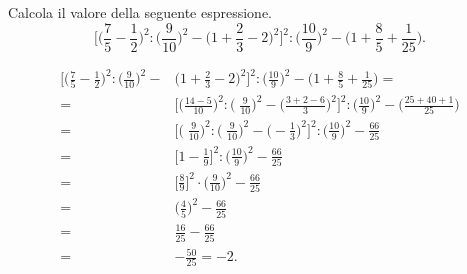 \begin{esempio}
   Calcola il valore della seguente espressione.
\[\bigg[\bigg(\frac{7}{5}-\frac{1}{2}\bigg)^{2}:\bigg(\frac{9}{10}\bigg)^{2}-\bigg(1+\frac{2}{3}-2\bigg)^{2}\bigg]^{2}:\bigg(\frac{10}{9}\bigg)^{2}-\bigg(1+\frac{8}{5}+\frac{1}{25}\bigg).\]

 \begin{align*}
\bigg[\bigg(\frac{7}{5}-\frac{1}{2}\bigg)^{2}:\bigg(\frac{9}{10}\bigg)^{2}-&\bigg(1+\frac{2}{3}-2\bigg)^{2}\bigg]^{2}:%
\bigg(\frac{10}{9}\bigg)^{2}-\bigg(1+\frac{8}{5}+\frac{1}{25}\bigg)=\\
=&\bigg[\bigg(\frac{14-5}{10}\bigg)^{2}:\bigg(\;\frac{9}{10}\bigg)^{2}-\bigg(\frac{3+2-6}{3}\bigg)^{2}\bigg]^{2}:%
\bigg(\frac{10}{9}\bigg)^{2}-\bigg(\frac{25+40+1}{25}\bigg)\\
=&\bigg[\bigg(\;\frac{9}{10}\bigg)^{2}:\bigg(\;\frac{9}{10}\bigg)^{2}-\bigg(-{\frac{1}{3}}\bigg)^{2}\bigg]^{2}:\bigg(\frac{10}{9}\bigg)^{2}-\frac{66}{25}\\
=&\bigg[1-\frac{1}{9}\bigg]^{2}:\bigg(\frac{10}{9}\bigg)^{2}-\frac{66}{25}\\
=&\bigg[\frac{8}{9}\bigg]^{2}\cdot\bigg(\frac{9}{10}\bigg)^{2}-\frac{66}{25}\\
=&\bigg(\frac{4}{5}\bigg)^{2}-\frac{66}{25}\\
=&\frac{16}{25}-\frac{66}{25}\\
=&-{\frac{50}{25}}=-2.
\end{align*}
\end{esempio}

\vspazio\ovalbox{\risolvii \ref{ese:3.130}, \ref{ese:3.131}, \ref{ese:3.132}, \ref{ese:3.133}, \ref{ese:3.134}, \ref{ese:3.135}, \ref{ese:3.136}, \ref{ese:3.137}, \ref{ese:3.138}, \ref{ese:3.139}}

\newpage

\cleardoublepage
